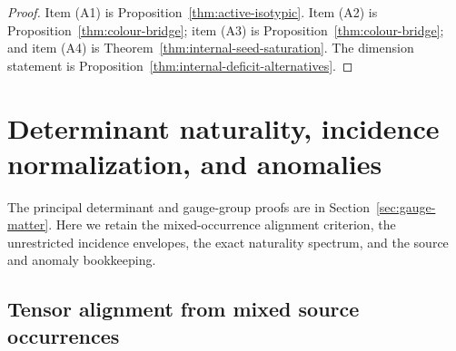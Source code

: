 \documentclass[11pt]{article}
\numberwithin{equation}{section}
\theoremstyle{definition}
\theoremstyle{remark}
\begin{document}
\begin{proof}
Item (A1) is Proposition~\ref{thm:active-isotypic}.  Item (A2) is
Proposition~\ref{thm:colour-bridge}; item (A3) is
Proposition~\ref{thm:colour-bridge}; and item (A4) is
Theorem~\ref{thm:internal-seed-saturation}.  The dimension statement is
Proposition~\ref{thm:internal-deficit-alternatives}.
\end{proof}


\section{Determinant naturality, incidence normalization, and anomalies}
\label{app:naturality}

The principal determinant and gauge-group proofs are in
Section~\ref{sec:gauge-matter}.  Here we retain the mixed-occurrence alignment
criterion, the unrestricted incidence envelopes, the exact naturality
spectrum, and the source and anomaly bookkeeping.


\subsection{Tensor alignment from mixed source occurrences}
\label{app:tensor-alignment}
\end{document}
